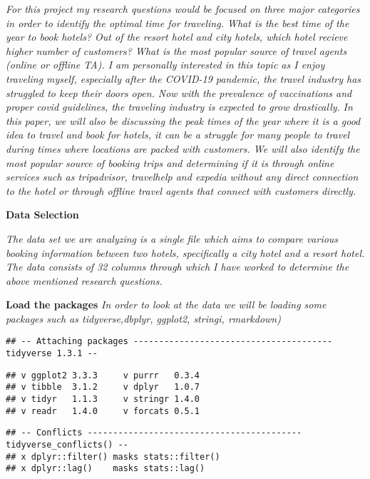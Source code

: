 \documentclass[
]{article}
\begin{document}
\emph{For this project my research questions would be focused on three
major categories in order to identify the optimal time for traveling.
What is the best time of the year to book hotels? Out of the resort
hotel and city hotels, which hotel recieve higher number of customers?
What is the most popular source of travel agents (online or offline TA).
I am personally interested in this topic as I enjoy traveling myself,
especially after the COVID-19 pandemic, the travel industry has
struggled to keep their doors open. Now with the prevalence of
vaccinations and proper covid guidelines, the traveling industry is
expected to grow drastically.} \emph{In this paper, we will also be
discussing the peak times of the year where it is a good idea to travel
and book for hotels, it can be a struggle for many people to travel
during times where locations are packed with customers. We will also
identify the most popular source of booking trips and determining if it
is through online services such as tripadvisor, travelhelp and expedia
without any direct connection to the hotel or through offline travel
agents that connect with customers directly.}

\textbf{Data Selection}

\emph{The data set we are analyzing is a single file which aims to
compare various booking information between two hotels, specifically a
city hotel and a resort hotel. The data consists of 32 columns through
which I have worked to determine the above mentioned research
questions.}

\textbf{Load the packages} \emph{In order to look at the data we will be
loading some packages such as tidyverse,dbplyr, ggplot2, stringi,
rmarkdown)}

\begin{verbatim}
## -- Attaching packages --------------------------------------- tidyverse 1.3.1 --
\end{verbatim}

\begin{verbatim}
## v ggplot2 3.3.3     v purrr   0.3.4
## v tibble  3.1.2     v dplyr   1.0.7
## v tidyr   1.1.3     v stringr 1.4.0
## v readr   1.4.0     v forcats 0.5.1
\end{verbatim}

\begin{verbatim}
## -- Conflicts ------------------------------------------ tidyverse_conflicts() --
## x dplyr::filter() masks stats::filter()
## x dplyr::lag()    masks stats::lag()
\end{verbatim}
\end{document}

